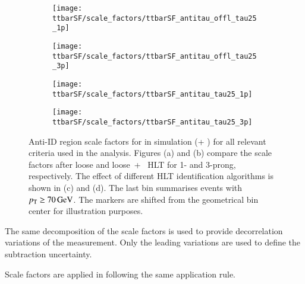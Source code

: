 \begin{figure}[htbp]
  \centering

  \begin{subfigure}[t]{.495\textwidth}
    \texttt{[image: ttbarSF/scale\_factors/ttbarSF\_antitau\_offl\_tau25\_1p]}
    \caption{}
    \label{fig:ttbarSF_antiid_SF_a}
  \end{subfigure}\hfill%
  \begin{subfigure}[t]{.495\textwidth}
    \texttt{[image: ttbarSF/scale\_factors/ttbarSF\_antitau\_offl\_tau25\_3p]}
    \caption{}
    \label{fig:ttbarSF_antiid_SF_b}
  \end{subfigure}

  \begin{subfigure}[t]{.495\textwidth}
    \texttt{[image: ttbarSF/scale\_factors/ttbarSF\_antitau\_tau25\_1p]}
    \caption{}
    \label{fig:ttbarSF_antiid_SF_c}
  \end{subfigure}\hfill%
  \begin{subfigure}[t]{.495\textwidth}
    \texttt{[image: ttbarSF/scale\_factors/ttbarSF\_antitau\_tau25\_3p]}
    \caption{}
    \label{fig:ttbarSF_antiid_SF_d}
  \end{subfigure}

  \caption{Anti-ID region scale factors for \faketauhadvis in \ttbar
    simulation (\POWHEGBOX[v2] + \PYTHIA[8]) for all relevant \tauid
    criteria used in the analysis. Figures (a) and (b) compare the
    scale factors after loose and loose~+~ HLT \tauid for 1- and
    3-prong, respectively. The effect of different HLT identification
    algorithms is shown in (c) and (d). The last bin summarises events
    with \tauhadvis~$\pT \geq \SI{70}{\GeV}$. The markers are shifted from
    the geometrical bin center for illustration purposes.}
  \label{fig:ttbarSF_antiid_SF}
\end{figure}

The same decomposition of the scale factors is used to provide
decorrelation variations of the measurement. Only the leading
variations are used to define the subtraction uncertainty.

Scale factors are applied in \hadhad following the same application
rule.




